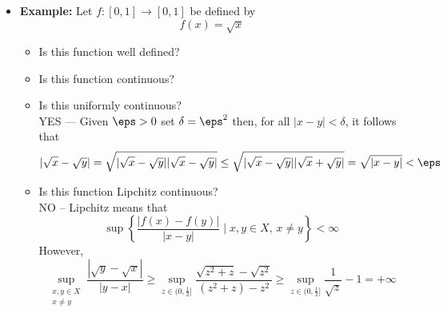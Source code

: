 \documentclass[11pt,twoside]{report}
\begin{document}
\begin{itemize}
\begin{itemize}
\begin{itemize}
\item Is this function uniformly continuous? \\

NO -- The negation of uniformly continuous is
 \[
 \exists \epsilon >0, \forall \delta >0, \exists x_0, x  \in X \text{ s.t. }  ( |x-x_0|<\delta )  \wedge   ( |f(x)-f(x_0)|\ge \epsilon)
  \]
Let $\epsilon = 1$. Given any  $\delta > 0$, set $x_0 = \min\big\{ \frac{1}{2},\frac{\delta}{2} \big\}$ and  $x=2 x_0$.  Then 
\[
| x - x_0 | = x_0 \leq \frac{\delta}{2}
\]
and so
\[
 \left| \frac{1}{x}-\frac{1}{x_0} \right| = \left| \frac{x_0 - x}{x \, x_0} \right| = \frac{x_0}{x \, x_0} = \frac{1}{x} = \max\left\{1,\frac{1}{\delta}\right\} \ge 1  = \eps
 \]

\end{itemize}

\begin{center}
\end{center}


\item \textbf{Example:} Let $f \colon [0,1] \to [0,1]$ be defined by
\[
f(x) = \sqrt{x} 
\]
\begin{itemize}
\item Is this function well defined?

\item Is this function continuous?
\item Is this uniformly continuous?\\

YES --- Given $\eps > 0$ set $\delta = \eps^2$ then, for all $|x-y|  < \delta$, it follows that
\[
|\sqrt{x} - \sqrt{y} | = \sqrt{ |\sqrt{x} - \sqrt{y} | |\sqrt{x} - \sqrt{y} | }  \le  \sqrt{ |\sqrt{x} - \sqrt{y} | |\sqrt{x} + \sqrt{y} | }  = \sqrt{ | x- y|}  < \eps 
\]
\item Is this function Lipchitz continuous?\\

NO --   Lipchitz means that
\[
\sup \left\{ \frac{ |f(x) - f(y)| }{ |x- y| } \mid x, y \in X,  \,  x \ne y \right \}  < \infty
\]
However, 
\[ \sup_{\substack{x,y\in X \\ x\neq y}} \frac{|\sqrt{y} - \sqrt{x}|}{|y-x|} \geq \sup_{z\in (0,\frac{1}{2}]} \frac{\sqrt{z^2 + z}-\sqrt{z^2}}{(z^2+z)-z^2} \geq \sup_{z\in (0,\frac{1}{2}]}  \frac{1}{\sqrt{z}} - 1  = + \infty
\]


\end{itemize}
\end{itemize}
\end{itemize}
\end{document}
